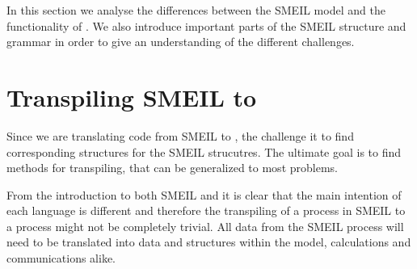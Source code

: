 


In this section we analyse the differences between the SMEIL model and the functionality of \cspm. We also introduce important parts of the SMEIL structure and grammar in order to give an understanding of the different challenges.

\section{Transpiling SMEIL to \cspm{}} \label{sec:transpiling}
Since we are translating code from SMEIL to \cspm{}, the challenge it to find corresponding \cspm{} structures for the SMEIL strucutres. The ultimate goal is to find methods for transpiling, that can be generalized to most problems.

From the introduction to both SMEIL and \cspm it is clear that the main intention of each language is different and therefore the transpiling of a process in SMEIL to a \cspm process might not be completely trivial. All data from the SMEIL process will need to be translated into data and structures within the \cspm model, calculations and communications alike.







